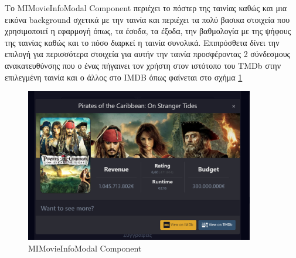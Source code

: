 
Το MIMovieInfoModal Component περιέχει το πόστερ της ταινίας καθώς και μια εικόνα background σχετικά με την ταινία και περιέχει τα πολύ βασικα στοιχεία που χρησιμοποιεί η εφαρμογή όπως, τα έσοδα, τα έξοδα, την βαθμολογία με της ψήφους της ταινίας καθώς και το πόσο διαρκεί η ταινία συνολικά. Επιπρόσθετα δίνει την επιλογή για περισσότερα στοιχεία για αυτήν την ταινία προσφέροντας 2 σύνδεσμους ανακατευθύνσης που ο ένας πήγαινει τον χρήστη στον ιστότοπο του TMDb στην επιλεγμένη ταινία και ο άλλος στο IMDB όπως φαίνεται στο σχήμα \ref{layout:mimoviemodal}

\begin{figure}[H]
  \centering
  \includegraphics[width=100mm]{Chapters/5 - Architecture/Client/Images/mimoviemodal.png}
  \caption{MIMovieInfoModal Component}
  \label{layout:mimoviemodal}
\end{figure}